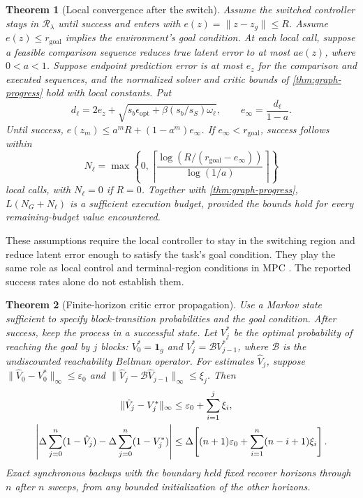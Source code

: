 \documentclass{article}
\newcommand{\ind}{\mathbf{1}}
\newcommand{\Rset}{\mathcal R_\lambda}
\newtheorem{theorem}{Theorem}
\theoremstyle{definition}
\theoremstyle{remark}
\begin{document}
\begin{theorem}[Local convergence after the switch]
\label{thm:local}
Assume the switched controller stays in $\Rset$ until success and enters with
$e(z)=\|z-z_g\|\le R$. Assume $e(z)\le r_{\mathrm{goal}}$ implies the environment's
goal condition. At each local call, suppose a feasible comparison sequence reduces true
latent error to at most $a e(z)$, where $0<a<1$.
Suppose endpoint prediction error is at most $e_z$ for the comparison and executed
sequences, and the normalized solver and critic bounds of \cref{thm:graph-progress}
hold with local constants. Put
\begin{equation}
 d_\ell=2e_z+
 \sqrt{s_b\epsilon_{\mathrm{opt}}+\beta(s_b/s_S)\omega_\ell},
 \qquad e_\infty=\frac{d_\ell}{1-a}.
 \label{eq:local-floor}
\end{equation}
Until success, $e(z_m)\le a^mR+(1-a^m)e_\infty$.
If $e_\infty<r_{\mathrm{goal}}$, success follows within
\[
 N_\ell=\max\!\left\{0,\left\lceil
 \frac{\log(R/(r_{\mathrm{goal}}-e_\infty))}{\log(1/a)}
 \right\rceil\right\}
\]
local calls, with $N_\ell=0$ if $R=0$.
Together with \cref{thm:graph-progress}, $L(N_G+N_\ell)$ is a sufficient execution budget,
provided the bounds hold for every remaining-budget value encountered.
\end{theorem}

These assumptions require the local controller to stay in the switching region and
reduce latent error enough to satisfy the task's goal condition. They play the same role
as local control and terminal-region conditions in MPC \citep{mayne2000}.
The reported success rates alone do not establish them.

\begin{theorem}[Finite-horizon critic error propagation]
\label{thm:critic}
Use a Markov state sufficient to specify block-transition probabilities and the goal condition. After success,
keep the process in a successful state. Let $V_j^*$ be the optimal probability of reaching the goal by $j$
blocks: $V_0^*=\ind_g$ and $V_j^*=\mathcal B V_{j-1}^*$, where $\mathcal B$ is the
undiscounted reachability Bellman operator.
For estimates $\hat V_j$, suppose
$\|\hat V_0-V_0^*\|_\infty\le\varepsilon_0$ and
$\|\hat V_j-\mathcal B\hat V_{j-1}\|_\infty\le\xi_j$.
Then
\begin{align}
 \|\hat V_j-V_j^*\|_\infty
 &\le\varepsilon_0+\sum_{i=1}^j\xi_i, \notag\\
 \left|\Delta\sum_{j=0}^n(1-\hat V_j)
       -\Delta\sum_{j=0}^n(1-V_j^*)\right|
 &\le\Delta\!\left[(n+1)\varepsilon_0+
                      \sum_{i=1}^n(n-i+1)\xi_i\right].
 \label{eq:critic-bound}
\end{align}
Exact synchronous backups with the boundary held fixed recover horizons through $n$
after $n$ sweeps, from any bounded initialization of the other horizons.
\end{theorem}
\end{document}

